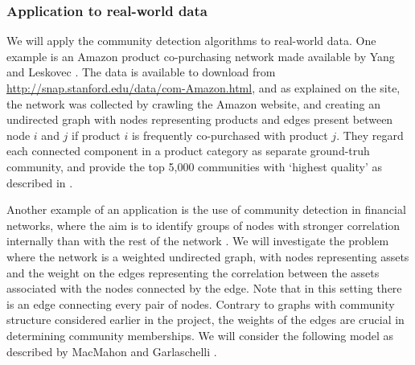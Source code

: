 \documentclass[12pt]{article}
\numberwithin{equation}{section}
\begin{document}
\subsubsection{Application to real-world data}
\label{subsubsec:communityDetectionApplicationToRealWorldData}

We will apply the community detection algorithms to real-world data. One example is an Amazon product co-purchasing network made available by Yang and Leskovec \cite{YL12}. The data is available to download from \url{http://snap.stanford.edu/data/com-Amazon.html}, and as explained on the site, the network was collected by crawling the Amazon website, and creating an undirected graph with nodes representing products and edges present between node $i$ and $j$ if product $i$ is frequently co-purchased with product $j$. They regard each connected component in a product category as separate ground-truh community, and provide the top 5,000 communities with `highest quality' as described in \cite{YL12}.

Another example of an application is the use of community detection in financial networks, where the aim is to identify groups of nodes with stronger correlation internally than with the rest of the network \cite{MG13}. We will investigate the problem where the network is a weighted undirected graph, with nodes representing assets and the weight on the edges representing the correlation between the assets associated with the nodes connected by the edge. Note that in this setting there is an edge connecting every pair of nodes. Contrary to graphs with community structure considered earlier in the project, the weights of the edges are crucial in determining community memberships. We will consider the following model as described by MacMahon and Garlaschelli \cite{MG13}.
\end{document}
